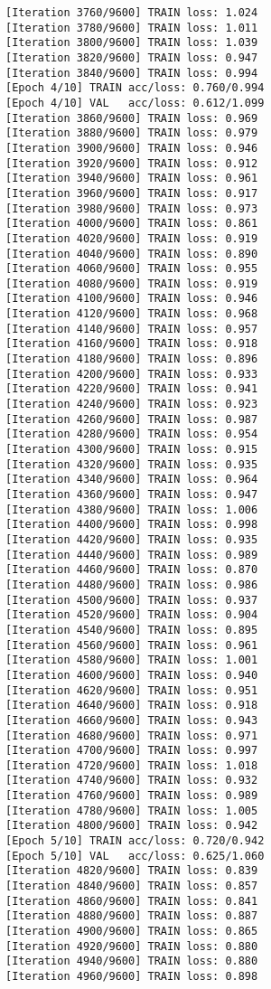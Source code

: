 \documentclass[11pt]{article}
\begin{document}
\begin{Verbatim}[commandchars=\\\{\}]
[Iteration 3760/9600] TRAIN loss: 1.024
[Iteration 3780/9600] TRAIN loss: 1.011
[Iteration 3800/9600] TRAIN loss: 1.039
[Iteration 3820/9600] TRAIN loss: 0.947
[Iteration 3840/9600] TRAIN loss: 0.994
[Epoch 4/10] TRAIN acc/loss: 0.760/0.994
[Epoch 4/10] VAL   acc/loss: 0.612/1.099
[Iteration 3860/9600] TRAIN loss: 0.969
[Iteration 3880/9600] TRAIN loss: 0.979
[Iteration 3900/9600] TRAIN loss: 0.946
[Iteration 3920/9600] TRAIN loss: 0.912
[Iteration 3940/9600] TRAIN loss: 0.961
[Iteration 3960/9600] TRAIN loss: 0.917
[Iteration 3980/9600] TRAIN loss: 0.973
[Iteration 4000/9600] TRAIN loss: 0.861
[Iteration 4020/9600] TRAIN loss: 0.919
[Iteration 4040/9600] TRAIN loss: 0.890
[Iteration 4060/9600] TRAIN loss: 0.955
[Iteration 4080/9600] TRAIN loss: 0.919
[Iteration 4100/9600] TRAIN loss: 0.946
[Iteration 4120/9600] TRAIN loss: 0.968
[Iteration 4140/9600] TRAIN loss: 0.957
[Iteration 4160/9600] TRAIN loss: 0.918
[Iteration 4180/9600] TRAIN loss: 0.896
[Iteration 4200/9600] TRAIN loss: 0.933
[Iteration 4220/9600] TRAIN loss: 0.941
[Iteration 4240/9600] TRAIN loss: 0.923
[Iteration 4260/9600] TRAIN loss: 0.987
[Iteration 4280/9600] TRAIN loss: 0.954
[Iteration 4300/9600] TRAIN loss: 0.915
[Iteration 4320/9600] TRAIN loss: 0.935
[Iteration 4340/9600] TRAIN loss: 0.964
[Iteration 4360/9600] TRAIN loss: 0.947
[Iteration 4380/9600] TRAIN loss: 1.006
[Iteration 4400/9600] TRAIN loss: 0.998
[Iteration 4420/9600] TRAIN loss: 0.935
[Iteration 4440/9600] TRAIN loss: 0.989
[Iteration 4460/9600] TRAIN loss: 0.870
[Iteration 4480/9600] TRAIN loss: 0.986
[Iteration 4500/9600] TRAIN loss: 0.937
[Iteration 4520/9600] TRAIN loss: 0.904
[Iteration 4540/9600] TRAIN loss: 0.895
[Iteration 4560/9600] TRAIN loss: 0.961
[Iteration 4580/9600] TRAIN loss: 1.001
[Iteration 4600/9600] TRAIN loss: 0.940
[Iteration 4620/9600] TRAIN loss: 0.951
[Iteration 4640/9600] TRAIN loss: 0.918
[Iteration 4660/9600] TRAIN loss: 0.943
[Iteration 4680/9600] TRAIN loss: 0.971
[Iteration 4700/9600] TRAIN loss: 0.997
[Iteration 4720/9600] TRAIN loss: 1.018
[Iteration 4740/9600] TRAIN loss: 0.932
[Iteration 4760/9600] TRAIN loss: 0.989
[Iteration 4780/9600] TRAIN loss: 1.005
[Iteration 4800/9600] TRAIN loss: 0.942
[Epoch 5/10] TRAIN acc/loss: 0.720/0.942
[Epoch 5/10] VAL   acc/loss: 0.625/1.060
[Iteration 4820/9600] TRAIN loss: 0.839
[Iteration 4840/9600] TRAIN loss: 0.857
[Iteration 4860/9600] TRAIN loss: 0.841
[Iteration 4880/9600] TRAIN loss: 0.887
[Iteration 4900/9600] TRAIN loss: 0.865
[Iteration 4920/9600] TRAIN loss: 0.880
[Iteration 4940/9600] TRAIN loss: 0.880
[Iteration 4960/9600] TRAIN loss: 0.898

\end{Verbatim}
\end{document}
